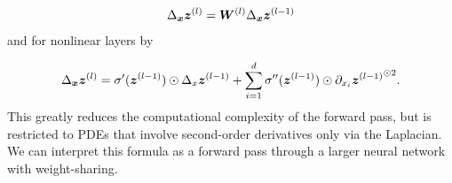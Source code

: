 \begin{align}\label{eq:forward_Laplacian_linear}
    \Delta_{\bm{x}}{\bm{z}}^{(l)} = {\bm{W}}^{(l)}\Delta_{\bm{x}}{\bm{z}}^{(l-1)}
\end{align}
and for nonlinear layers by
\begin{comment}
    \begin{align}
    \mZ^{(l)}
    =
     \begin{pmatrix}
         \sigma(\vz^{(l-1)}) \\
         \sigma'(\vz^{(l-1)})\odot \partial_{x_1}\vz^{(l-1)} \\
         \vdots \\
         \sigma'(\vz^{(l-1)})\odot \partial_{x_d}\vz^{(l-1)} \\
         \sigma'(\vz^{(l-1)})\odot\Delta_x\vz^{(l-1)} + \sum_{i=1}^d \sigma''(\vz^{(l-1)})\odot \partial_{x_i}{\vz^{(l-1)}}^{\odot 2}
     \end{pmatrix}
     \label{eq:forward-laplacian-nonlinear-layer-compact}
\end{align}
\end{comment}
\begin{align}\label{eq:forward_Laplacian_nonlinear}
    \Delta_{\bm{x}}{\bm{z}}^{(l)} = \sigma'({\bm{z}}^{(l-1)})\odot\Delta_x{\bm{z}}^{(l-1)} + \sum_{i=1}^d \sigma''({\bm{z}}^{(l-1)})\odot \partial_{x_i}{{\bm{z}}^{(l-1)}}^{\odot 2}. 
\end{align}
This greatly reduces the computational complexity of the forward pass, but is restricted to PDEs that involve second-order derivatives only via the Laplacian. %
We can interpret this formula as a forward pass through a larger neural network with weight-sharing. 
\begin{comment}
    by introducing the vector $\mZ^{(l)}\coloneqq  \begin{pmatrix}
    \vz^{(l)}
    &
    \partial_{\vx_1} \vz^{(l)}
    &
    \dots
    &
    \partial_{\vx_d} \vz^{(l)}
    &
    \Delta_\vx\vz^{(l)}
\end{pmatrix}\in \mathbb R^{(d+2)h^{(l)}}$. 
     with 
$\mZ^{(0)}=  \begin{pmatrix}
    \vx
    &
    \ve_1
    &
    \dots
    &
    \ve_d
    &
    0
\end{pmatrix}\in \mathbb R^{(d+2)d}$.
Rearranging $\mZ^{(l)}$ as a matrix of shape $(d+2)\times h^{(l)}$ and yields $\mZ^{(l)} = \mZ^{(l-1)}{\mW^{(l)}}^\top$ for linear layers.
\end{comment}

